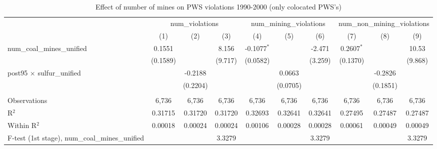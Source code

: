 
\begin{table}[htbp]
   \caption{\label{olsrf2sls_nummine_count_vio_1990to2000colocate_coalunified} Effect of number of mines on PWS violations 1990-2000 (only colocated PWS's)}
   \bigskip
   \centering
   \begin{adjustbox}{width = \textwidth, center}
      \begin{tabular}{lccccccccc}
         \toprule
          & \multicolumn{3}{c}{num\_violations} & \multicolumn{3}{c}{num\_mining\_violations} & \multicolumn{3}{c}{num\_non\_mining\_violations}\\
                                                          & (1)           & (2)           & (3)           & (4)           & (5)           & (6)           & (7)           & (8)           & (9)\\  
         \midrule 
         num\_coal\_mines\_unified                        & 0.1551        &               & 8.156         & -0.1077$^{*}$ &               & -2.471        & 0.2607$^{*}$  &               & 10.53\\   
                                                          & (0.1589)      &               & (9.717)       & (0.0582)      &               & (3.259)       & (0.1370)      &               & (9.868)\\   
         post95 $\times$ sulfur\_unified                  &               & -0.2188       &               &               & 0.0663        &               &               & -0.2826       &   \\   
                                                          &               & (0.2204)      &               &               & (0.0705)      &               &               & (0.1851)      &   \\   
          \\
         Observations                                     & 6,736         & 6,736         & 6,736         & 6,736         & 6,736         & 6,736         & 6,736         & 6,736         & 6,736\\  
         R$^2$                                            & 0.31715       & 0.31720       & 0.31720       & 0.32693       & 0.32641       & 0.32641       & 0.27495       & 0.27487       & 0.27487\\  
         Within R$^2$                                     & 0.00018       & 0.00024       & 0.00024       & 0.00106       & 0.00028       & 0.00028       & 0.00061       & 0.00049       & 0.00049\\  
         F-test (1st stage), num\_coal\_mines\_unified    &               &               & 3.3279        &               &               & 3.3279        &               &               & 3.3279\\  

\end{tabular}
\end{adjustbox}
\end{table}
